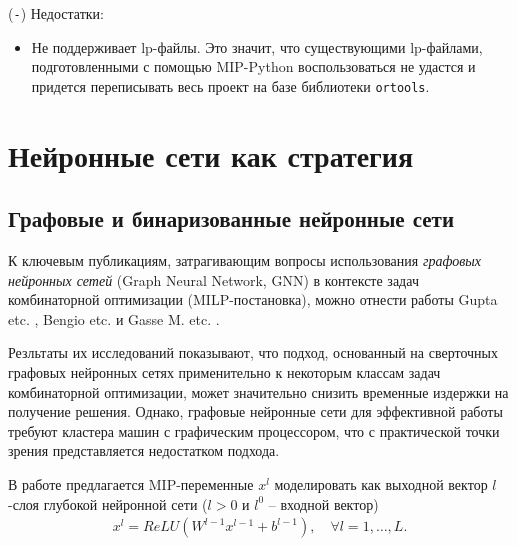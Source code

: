 \documentclass[%
	11pt,
	a4paper,
	utf8,
		]{article}
\begin{document}
(\texttt{-}) Недостатки:
\begin{itemize}
	\item Не поддерживает lp-файлы. Это значит, что существующими lp-файлами, подготовленными с помощью MIP-Python воспользоваться не удастся и придется переписывать весь проект на базе библиотеки \texttt{ortools}.
\end{itemize}



\section{Нейронные сети как стратегия}

\subsection{Графовые и бинаризованные нейронные сети}

К ключевым публикациям, затрагивающим вопросы использования \emph{графовых нейронных сетей} (Graph Neural Network, GNN) в контексте задач комбинаторной оптимизации (MILP-постановка), можно отнести работы Gupta etc. \cite{gupta:hybrid-2020}, Bengio etc. \cite{bengio:ml-comb-2020} и Gasse M. etc. \cite{gasse:comb-opt-GCNN-2019}.

Резльтаты их исследований показывают, что подход, основанный на сверточных графовых нейронных сетях применительно к некоторым классам задач комбинаторной оптимизации, может значительно снизить временные издержки на получение решения. Однако, графовые нейронные сети для эффективной работы требуют кластера машин с графическим процессором, что с практической точки зрения представляется недостатком подхода.

В работе \cite{fischetti:2018} предлагается MIP-переменные $ x^l $ моделировать как выходной вектор $ l $-слоя глубокой нейронной сети ($ l > 0 $ и $ l^0 $ -- входной вектор)
\begin{align*}
	x^l = ReLU(W^{l - 1}x^{l-1} + b^{l-1}), \quad \forall l = 1,\ldots, L.
\end{align*}
\end{document}
